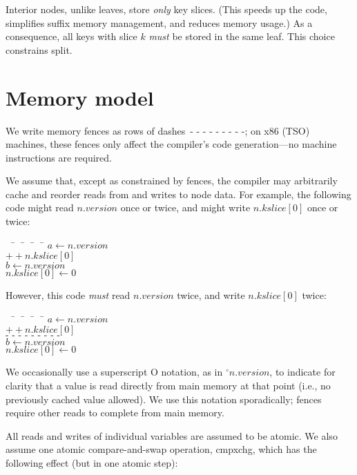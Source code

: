 \documentclass[11pt]{article}
\makeatletter
\newcommand{\V}[1]{\textit{#1}}
\newcommand{\readnow}[1]{\ensuremath{{}^\circ#1}}
\newcommand{\fencebase}{\text{- - - - - - - - -}}
\newcommand{\fence}{\ensuremath{\fencebase}}
\newenvironment{programtabbing}%
  {\begingroup\parskip\z@\begin{tabbing}\quad\qquad~~\= \quad~~\= \quad~~\= \quad~~\=\kill}%
  {\unskip\end{tabbing}\endgroup}
\makeatother
\begin{document}
Interior nodes, unlike leaves, store \emph{only} key slices. (This
speeds up the code, simplifies suffix memory management, and reduces
memory usage.) As a consequence, all keys with slice \(k\) \emph{must}
be stored in the same leaf. This choice constrains split.


\section{Memory model}

We write memory fences as rows of dashes\ \fence; on x86 (TSO) machines,
these fences only affect the compiler's code generation---no machine
instructions are required.

We assume that, except as constrained by fences, the compiler may
arbitrarily cache and reorder reads from and writes to node data. For
example, the following code might read \(n.\V{version}\) once or twice,
and might write \(n.\V{kslice}[0]\) once or twice:

\begin{programtabbing}
\(a \gets n.\V{version}\) \\
\(++n.\V{kslice}[0]\) \\
\(b \gets n.\V{version}\) \\
\(n.\V{kslice}[0] \gets 0\)
\end{programtabbing}

\noindent
However, this code \emph{must} read \(n.\V{version}\) twice, and write
\(n.\V{kslice}[0]\) twice:

\begin{programtabbing}
\(a \gets n.\V{version}\) \\
\(++n.\V{kslice}[0]\) \\
\fence \\
\(b \gets n.\V{version}\) \\
\(n.\V{kslice}[0] \gets 0\)
\end{programtabbing}

We occasionally use a superscript O notation, as in
\(\readnow{n.\V{version}}\), to indicate for clarity that a value is
read directly from main memory at that point (i.e., no previously cached
value allowed). We use this notation sporadically; fences require other
reads to complete from main memory.

All reads and writes of individual variables are assumed to be atomic.
We also assume one atomic compare-and-swap operation, cmpxchg, which has
the following effect (but in one atomic step):
\end{document}
